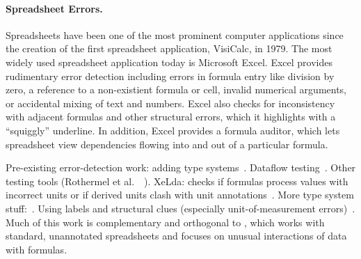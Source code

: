\paragraph{Spreadsheet Errors.}
Spreadsheets have been one of the most prominent computer applications
since the creation of the first spreadsheet application, VisiCalc, in
1979. The most widely used spreadsheet application today is Microsoft
Excel. Excel provides rudimentary error detection including errors in
formula entry like division by zero, a reference to a non-existient
formula or cell, invalid numerical arguments, or accidental mixing of
text and numbers.
Excel also checks for inconsistency with adjacent formulas and other
structural errors, which it highlights with a ``squiggly'' underline. In addition, Excel provides a formula auditor, which lets spreadsheet view dependencies flowing into and out of a particular formula.

Pre-existing error-detection work: adding type
systems~\cite{DBLP:conf/kbse/AhmadAGK03}. Dataflow
testing~\cite{fisher2006scaling}. Other testing tools (Rothermel et
al.\
~\cite{rothermel1998you,rothermel2001methodology,Carver:2006:EET:1159733.1159775}). XeLda:
checks if formulas process values with incorrect units or if derived
units clash with unit
annotations~\cite{Antoniu:2004:VUC:998675.999448}.  More type system
stuff:~\cite{Erwig:2005:AGM:1062455.1062494}. Using labels and
structural clues (especially unit-of-measurement
errors)~\cite{Chambers:2010:RSL:1860134.1860346}. Much of this work is
complementary and orthogonal to \checkcell{}, which works with
standard, unannotated spreadsheets and focuses on unusual interactions of
data with formulas.


